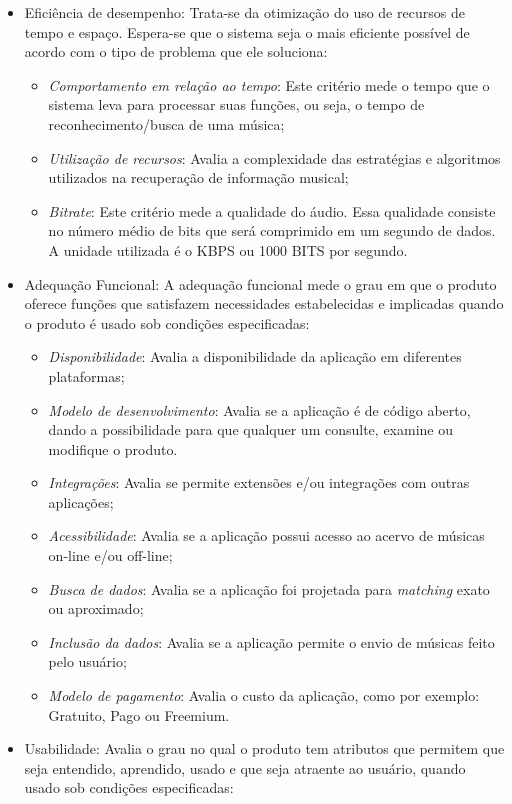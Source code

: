 \begin{itemize}
    \item Eficiência de desempenho: Trata-se da otimização do uso de recursos de tempo e espaço. Espera-se que o sistema seja o mais eficiente possível de acordo com o tipo de problema que ele soluciona:
    \begin{itemize}
        \item \textit{Comportamento em relação ao tempo}: Este critério mede o tempo que o sistema leva para processar suas funções, ou seja, o tempo de reconhecimento/busca de uma música;
        \item \textit{Utilização de recursos}: Avalia a complexidade das estratégias e algoritmos utilizados na recuperação de informação musical;
        \item \textit{Bitrate}: Este critério mede a qualidade do áudio. Essa qualidade consiste no número médio de bits que será comprimido em um segundo de dados. A unidade utilizada é o KBPS ou 1000 BITS por segundo.
    \end{itemize}
    \item Adequação Funcional: A adequação funcional mede o grau em que o produto oferece funções que satisfazem necessidades estabelecidas e implicadas quando o produto é usado sob condições especificadas:
    \begin{itemize}
        \item \textit{Disponibilidade}: Avalia a disponibilidade da aplicação em diferentes plataformas;
        \item \textit{Modelo de desenvolvimento}: Avalia se a aplicação é de código aberto, dando a possibilidade para que qualquer um consulte, examine ou modifique o produto.
        \item \textit{Integrações}: Avalia se permite extensões e/ou integrações com outras aplicações;
        \item \textit{Acessibilidade}: Avalia se a aplicação possui acesso ao acervo de músicas on-line e/ou off-line;
        \item \textit{Busca de dados}: Avalia se a aplicação foi projetada para \textit{matching} exato ou aproximado;
        \item \textit{Inclusão da dados}: Avalia se a aplicação permite o envio de músicas feito pelo usuário;
        \item \textit{Modelo de pagamento}: Avalia o custo da aplicação, como por exemplo: Gratuito, Pago ou Freemium.
    \end{itemize}
    \item Usabilidade: Avalia o grau no qual o produto tem atributos que permitem que seja entendido, aprendido, usado e que seja atraente ao usuário, quando usado sob condições especificadas:

\end{itemize}
